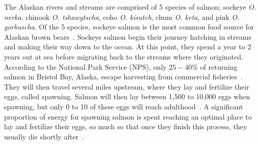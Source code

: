 The Alaskan rivers and streams are comprised of 5 species of salmon; sockeye \emph{O. nerka}, chinook \emph{O. tshawytscha}, coho \emph{O. kisutch}, chum \emph{O. keta}, and pink \emph{O. gorbuscha}.
Of the 5 species, sockeye salmon is the most common food source for Alaskan brown bears~\cite{ADFGsalmon}.
Sockeye salmon begin their journey hatching in streams and making their way down to the ocean.
At this point, they spend a year to 2 years out at sea before migrating back to the streams where they originated.
According to the National Park Service (NPS), only $25-40\%$ of returning salmon in Bristol Bay, Alaska, escape harvesting from commercial fisheries~\cite{NPS}.
They will then travel several miles upstream, where they lay and fertilize their eggs, called spawning.
Salmon will then lay between 1,500 to 10,000 eggs when spawning, but only 0 to 10 of these eggs will reach adulthood~\cite{WFRC}.
A significant proportion of energy for spawning salmon is spent reaching an optimal place to lay and fertilize their eggs, so much so that once they finish this process, they usually die shortly after~\cite{ADFGsalmon}. 

